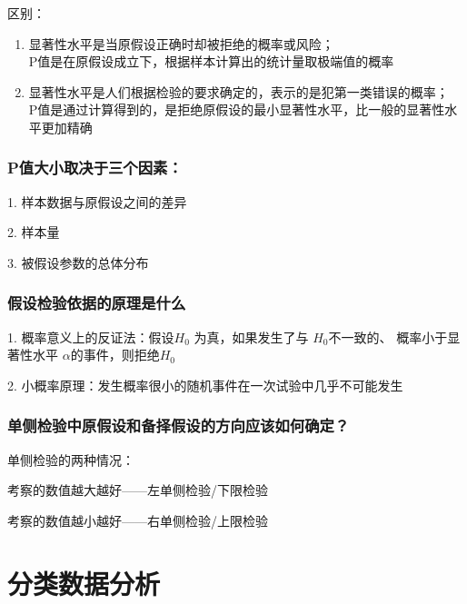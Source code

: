\documentclass[UTF8,10pt]{book}
\begin{document}
{{    区别： 
    
    \begin{enumerate}
    	\item 显著性水平是当原假设正确时却被拒绝的概率或风险；\\    	
    		P值是在原假设成立下，根据样本计算出的统计量取极端值的概率 
    	\item 显著性水平是人们根据检验的要求确定的，表示的是犯第一类错误的概率；\\    	
    		P值是通过计算得到的，是拒绝原假设的最小显著性水平，比一般的显著性水平更加精确
    	
    	
    	
    \end{enumerate}  
    

    
    \subsection{P值大小取决于三个因素： }
    
    1. 样本数据与原假设之间的差异 
    
    2. 样本量 

    3. 被假设参数的总体分布


    \subsection{假设检验依据的原理是什么}	
    1. 概率意义上的反证法：假设$ H_0 $ 为真，如果发生了与 $ H_0 $不一致的、
    概率小于显著性水平 $ \alpha $的事件，则拒绝$ H_0 $ 
    
    2. 小概率原理：发生概率很小的随机事件在一次试验中几乎不可能发生

    \subsection{单侧检验中原假设和备择假设的方向应该如何确定？}
    单侧检验的两种情况： 
    
    考察的数值越大越好——左单侧检验/下限检验 
    
    考察的数值越小越好——右单侧检验/上限检验
}






\clearpage







\chapter{分类数据分析}


}
\end{document}

